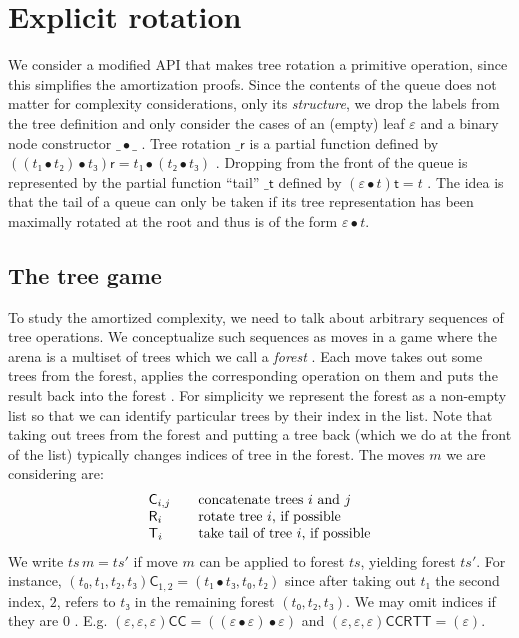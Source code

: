 \documentclass[svgnames,dvipsnames,table,review%
]{jfp-epi}
\newcommand{\rot}{\ensuremath{\mathord{\mathsf{r}}}}
\newcommand{\tail}{\ensuremath{\mathord{\mathsf{t}}}}
\newcommand{\tC}{\ensuremath{\mathsf{C}}}
\newcommand{\tR}{\ensuremath{\mathsf{R}}}
\newcommand{\tT}{\ensuremath{\mathsf{T}}}
\renewcommand{\Cat}[2]{\ensuremath{\tC_{#1,#2}}}
\newcommand{\Rot}[1]{\ensuremath{\tR_{#1}}}
\renewcommand{\Tail}[1]{\ensuremath{\tT_{#1}}}
\newcommand{\vts}{\ensuremath{\mathit{ts}}}
\newcommand{\vtsp}{\ensuremath{\mathit{ts'}}}
\begin{document}

\section{Explicit rotation}\label{sec:rotation}

%

We consider a modified API that makes tree rotation a primitive operation, since this simplifies the amortization proofs.
Since the contents of the queue does not matter for complexity considerations, only its \emph{structure}, we drop the labels from the tree definition and only consider the cases of an (empty) leaf \(ε\) and a binary node constructor \(\_∙\_\) .
Tree rotation \(\_\rot\) is a partial function defined by \(((t₁ ∙ t₂) ∙ t₃)\rot = t₁ ∙ (t₂ ∙ t₃)\) .
Dropping from the front of the queue is represented by the partial function ``tail'' \(\_\tail\) defined by \( (ε ∙ t)\tail = t \) .
The idea is that the tail of a queue can only be taken if its tree representation has been maximally rotated at the root and thus is of the form \( ε ∙ t \).

\subsection{The tree game}

To study the amortized complexity, we need to talk about arbitrary sequences of tree operations.
We conceptualize such sequences as moves in a game where the arena is a multiset of trees which we call a \emph{forest} .
Each move takes out some trees from the forest, applies the corresponding operation on them and puts the result back into the forest .
For simplicity we represent the forest as a non-empty list so that we can identify particular trees by their index in the list.  Note that taking out trees from the forest and putting a tree back (which we do at the front of the list) typically changes indices of tree in the forest.
The moves $m$  we are considering are:
\[
\begin{array}{l@{\qquad}l}
  \Cat i j & \mbox{concatenate trees $i$ and $j$} \\
  \Rot i   & \mbox{rotate tree $i$, if possible} \\
  \Tail i  & \mbox{take tail of tree $i$, if possible} \\
\end{array}
\]
We write $\vts \, m = \vtsp$  if move $m$ can be applied to forest $\vts$, yielding forest $\vts'$.
For instance, $(t₀, t₁, t₂, t₃) \Cat 1 2 = (t₁ ∙ t₃, t₀, t₂)$ since after taking out $t₁$ the second index, $2$, refers to $t₃$ in the remaining forest $(t₀, t₂, t₃)$.
We may omit indices if they are $0$ .
E.g. $(ε, ε, ε)\tC\tC = ((ε ∙ ε) ∙ ε)$ and $(ε, ε, ε)\tC\tC\tR\tT\tT = (ε)$.
\end{document}

